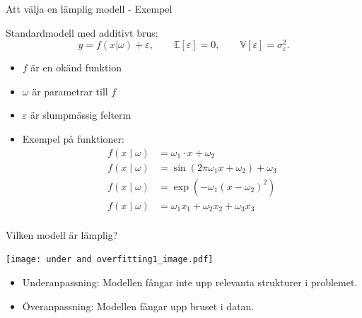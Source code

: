 \documentclass[10pt,english]{beamer}
\begin{document}
\begin{frame}{Att välja en lämplig modell - Exempel}
    
    Standardmodell med additivt brus:
    \begin{equation*}
        y = f(x | \omega) + \varepsilon, \qquad \mathbb{E}[\varepsilon] = 0, \qquad \mathbb{V}[\varepsilon] = \sigma^2_{\varepsilon}.
    \end{equation*}

    \begin{itemize}
        \item $f$ är en okänd funktion
        \item $\omega$ är parametrar till $f$
        \item $\varepsilon$ är slumpmässig felterm
        \item Exempel på funktioner:
        \begin{align*}
            f(x \mid \omega) &= \omega_1 \cdot x + \omega_2 \\
            f(x \mid \omega) &= \sin(2\pi \omega_1 x + \omega_2) + \omega_3 \\
            f(x \mid \omega) &= \exp(- \omega_1 (x - \omega_2)^2) \\
            f(x \mid \omega) &= \omega_1 x_1 + \omega_2 x_2 + \omega_3 x_3 \\
        \end{align*}
    \end{itemize}

\end{frame}

\begin{frame}{Vilken modell är lämplig?}
    \begin{center}
        \texttt{[image: under and overfitting1\_image.pdf]}
    \end{center}

    \begin{itemize}
        \item Underanpassning: Modellen fångar inte upp relevanta strukturer i problemet.
        \item Överanpassning: Modellen fångar upp bruset i datan.
    \end{itemize}

\end{frame}
\end{document}
